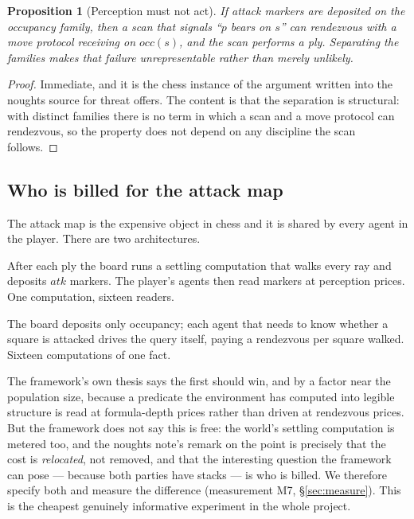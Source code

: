 \documentclass[11pt,a4paper]{article}
\theoremstyle{plain}
\newtheorem{proposition}[theorem]{Proposition}
\theoremstyle{definition}
\theoremstyle{remark}
\begin{document}
\begin{proposition}[Perception must not act]
\label{prop:percept}
If attack markers are deposited on the occupancy family, then a scan that
signals ``$p$ bears on $s$'' can rendezvous with a move protocol receiving on
$\mathit{occ}(s)$, and the scan performs a ply. Separating the families makes
that failure unrepresentable rather than merely unlikely.
\end{proposition}

\begin{proof}
Immediate, and it is the chess instance of the argument written into the noughts
source for threat offers. The content is that the separation is structural: with
distinct families there is no term in which a scan and a move protocol can
rendezvous, so the property does not depend on any discipline the scan follows.
\end{proof}

\subsection{Who is billed for the attack map}
\label{sec:billed}

The attack map is the expensive object in chess and it is shared by every agent
in the player. There are two architectures.

\begin{description}[leftmargin=1.6em,style=nextline]
\item[World-billed.] After each ply the board runs a settling computation that
walks every ray and deposits $\mathit{atk}$ markers. The player's agents then
read markers at perception prices. One computation, sixteen readers.
\item[Player-billed.] The board deposits only occupancy; each agent that needs
to know whether a square is attacked drives the query itself, paying a
rendezvous per square walked. Sixteen computations of one fact.
\end{description}

The framework's own thesis says the first should win, and by a factor near the
population size, because a predicate the environment has computed into legible
structure is read at formula-depth prices rather than driven at rendezvous
prices. But the framework does not say this is free: the world's settling
computation is metered too, and the noughts note's remark on the point is
precisely that the cost is \emph{relocated}, not removed, and that the
interesting question the framework can pose --- because both parties have stacks
--- is who is billed. We therefore specify both and measure the difference
(measurement M7, \S\ref{sec:measure}). This is the cheapest genuinely
informative experiment in the whole project.
\end{document}
